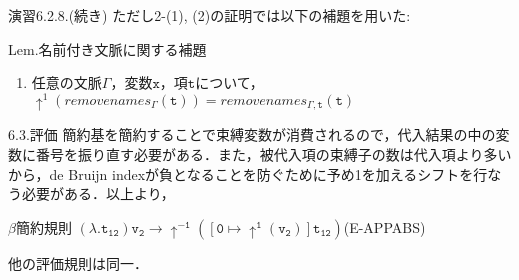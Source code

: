 \documentclass[9pt]{beamer}
\begin{document}
\begin{frame}{演習6.2.8.(続き)}
ただし2-(1), (2)の証明では以下の補題を用いた:\begin{alertblock}{Lem.名前付き文脈に関する補題}\begin{enumerate}
	\item 	任意の文脈$\Gamma$，変数$\mathtt{x}$，項$\mathtt{t}$について，$\uparrow^{1}(removenames_{\Gamma}(\mathtt{t})) = removenames_{\Gamma, \mathtt{t}}(\mathtt{t})$
\end{enumerate}
\end{alertblock}
\end{frame}
\begin{frame}{6.3.評価}
簡約基を簡約することで束縛変数が消費されるので，代入結果の中の変数に番号を振り直す必要がある．また，被代入項の束縛子の数は代入項より多いから，de Bruijn indexが負となることを防ぐために予め1を加えるシフトを行なう必要がある．以上より，\begin{dblock}{$\beta$簡約規則}
$\mathtt{(\lambda .t_{12})v_{2}\rightarrow \uparrow^{-1}\left(\left[\mathtt{0}\mapsto \uparrow^{1}(\mathtt{v_{2}})\right]\mathtt{t_{12}}\right)}$\small\rm{(E-APPABS)}
\end{dblock}
他の評価規則は同一．
\end{frame}
\end{document}
